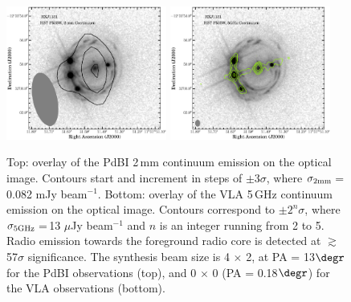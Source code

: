 \documentclass[]{emulateapj}
\newcommand{\pmOne}{\mbox{$^{-1}$}\xspace}
\begin{document}
\begin{figure}[!htbp]
\includegraphics[trim=12 27 0 1, clip, width=0.47\textwidth]{f4a.eps}
\includegraphics[trim=10 5 0 0, clip, width=0.47\textwidth]{f4b.eps}
\caption{Top: overlay of the PdBI 2\,mm continuum emission on the optical image.
Contours start and increment in steps of
$\pm$3$\sigma$, where $\sigma_{\rm 2mm}$\,=\,0.082 mJy beam\pmOne.
Bottom: overlay of the VLA 5\,GHz continuum emission on the optical image.
Contours correspond to $\pm2^n\sigma$, where
$\sigma_{\rm 5GHz}$\,=\,13 $\mu$Jy beam\pmOne
and $n$ is an integer running from 2 to 5.
Radio emission towards the foreground radio core is detected at $\gtrsim$57$\sigma$ significance.
The synthesis beam size is 4 $\times$ 2, at PA = 13$\degr$ for
the PdBI observations (top), and
0 $\times$ 0 (PA = 0.18$\degr$) for
the VLA observations (bottom).
\label{fig:cont}}\vspace{0.51em}
\end{figure}
\end{document}
